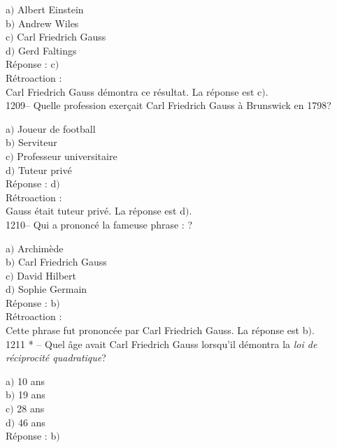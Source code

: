 ﻿\documentclass[letterpaper, 12pt]{article}
\begin{document}
a$)$ Albert Einstein\\
b$)$ Andrew Wiles \\
c$)$ Carl Friedrich Gauss \\
d$)$ Gerd Faltings \\

R\'eponse : c$)$\\

R\'etroaction : \\
Carl Friedrich Gauss d\'emontra ce r\'esultat.
La r\'eponse est c$)$.\\

1209-- Quelle profession exer\c cait Carl Friedrich Gauss \`a
Brunswick en 1798?

a$)$ Joueur de football\\
b$)$ Serviteur \\
c$)$ Professeur universitaire \\
d$)$ Tuteur priv\'e \\

R\'eponse : d$)$\\

R\'etroaction : \\
Gauss \'etait tuteur priv\'e.
La r\'eponse est d$)$.\\

1210-- Qui a prononc\'e la fameuse phrase : \fg ?

a$)$ Archim\`ede \\
b$)$ Carl Friedrich Gauss \\
c$)$ David Hilbert \\
d$)$ Sophie Germain\\

R\'eponse : b$)$\\

R\'etroaction : \\
Cette phrase fut prononc\'ee par Carl Friedrich Gauss.
La r\'eponse est b$)$.\\

1211 * -- Quel \^age avait Carl Friedrich Gauss lorsqu'il d\'emontra
la {\sl loi de r\'eciprocit\'e quadratique}?

a$)$ 10 ans \\
b$)$ 19 ans \\
c$)$ 28 ans \\
d$)$ 46 ans\\

R\'eponse : b$)$\\
\end{document}
